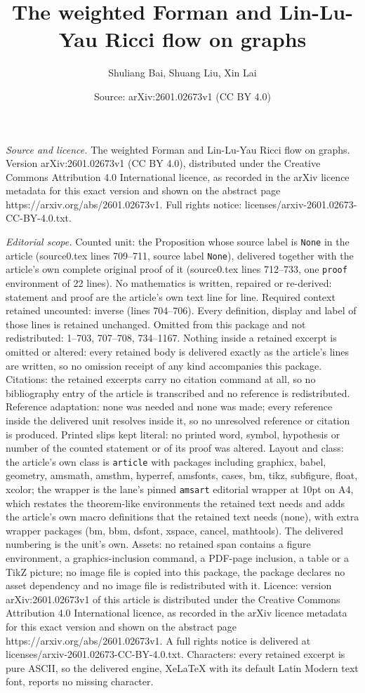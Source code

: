\documentclass[10pt,a4paper]{amsart}
\title[The weighted Forman and Lin-Lu-Yau Ricci flow on graphs]{The weighted Forman and Lin-Lu-Yau Ricci flow on graphs}
\author{Shuliang Bai, Shuang Liu, Xin Lai}
\date{Source: arXiv:2601.02673v1 (CC BY 4.0)}
\begin{document}
\maketitle

\noindent\emph{Source and licence.} The weighted Forman and Lin-Lu-Yau Ricci flow on graphs. Version arXiv:2601.02673v1 (CC BY 4.0), distributed under the Creative Commons Attribution 4.0 International licence, as recorded in the arXiv licence metadata for this exact version and shown on the abstract page https://arxiv.org/abs/2601.02673v1. Full rights notice: licenses/arxiv-2601.02673-CC-BY-4.0.txt.\par\smallskip

\noindent\textit{Editorial scope.} Counted unit: the Proposition whose source label is \texttt{None} in the article (source0.tex lines 709--711, source label \texttt{None}), delivered together with the article's own complete original proof of it (source0.tex lines 712--733, one \texttt{proof} environment of 22 lines). No mathematics is written, repaired or re-derived: statement and proof are the article's own text line for line. Required context retained uncounted: inverse (lines 704--706). Every definition, display and label of those lines is retained unchanged. Omitted from this package and not redistributed: 1--703, 707--708, 734--1167. Nothing inside a retained excerpt is omitted or altered: every retained body is delivered exactly as the article's lines are written, so no omission receipt of any kind accompanies this package. Citations: the retained excerpts carry no citation command at all, so no bibliography entry of the article is transcribed and no reference is redistributed. Reference adaptation: none was needed and none was made; every reference inside the delivered unit resolves inside it, so no unresolved reference or citation is produced. Printed slips kept literal: no printed word, symbol, hypothesis or number of the counted statement or of its proof was altered. Layout and class: the article's own class is \texttt{article} with packages including graphicx, babel, geometry, amsmath, amsthm, hyperref, amsfonts, cases, bm, tikz, subfigure, float, xcolor; the wrapper is the lane's pinned \texttt{amsart} editorial wrapper at 10pt on A4, which restates the theorem-like environments the retained text needs and adds the article's own macro definitions that the retained text needs (none), with extra wrapper packages (bm, bbm, dsfont, xspace, cancel, mathtools). The delivered numbering is the unit's own. Assets: no retained span contains a figure environment, a graphics-inclusion command, a PDF-page inclusion, a table or a TikZ picture; no image file is copied into this package, the package declares no asset dependency and no image file is redistributed with it. Licence: version arXiv:2601.02673v1 of this article is distributed under the Creative Commons Attribution 4.0 International licence, as recorded in the arXiv licence metadata for this exact version and shown on the abstract page https://arxiv.org/abs/2601.02673v1. A full rights notice is delivered at licenses/arxiv-2601.02673-CC-BY-4.0.txt. Characters: every retained excerpt is pure ASCII, so the delivered engine, XeLaTeX with its default Latin Modern text font, reports no missing character.
\end{document}
